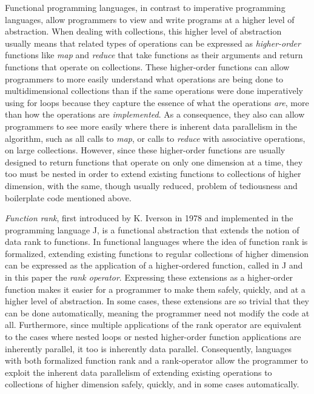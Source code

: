 Functional programming languages, in contrast to imperative programming languages, allow programmers to view and write programs at a higher level of abstraction.
When dealing with collections, 
this higher level of abstraction usually means that related types of operations can be expressed as \textit{higher-order} functions 
like \textit{map} and \textit{reduce} that take functions as their arguments and return functions that operate on collections.
These higher-order functions can allow programmers to more easily understand what operations are being done to multidimensional collections 
than if the same operations were done imperatively using for loops 
because they capture the essence of what the operations \textit{are}, more than how the operations are \textit{implemented}.
As a consequence, they also can allow programmers 
to see more easily where there is inherent data parallelism in the algorithm, 
such as all calls to \textit{map}, or calls to \textit{reduce} with associative operations, on large collections.
However, since these higher-order functions are usually designed to return functions that operate on only one dimension at a time, 
they too must be nested in order to extend existing functions to collections of higher dimension, 
with the same, though usually reduced, problem of tediousness and boilerplate code mentioned above.

\textit{Function rank}, first introduced by K. Iverson in 1978\cite{opandfunc} 
and implemented in the programming language J, 
is a functional abstraction that extends the notion of data rank to functions. 
In functional languages where the idea of function rank is formalized, 
extending existing functions to regular collections of higher dimension 
can be expressed as the application of a higher-ordered function, 
called in J and in this paper the \textit{rank operator}\cite{jvocab}. 
Expressing these extensions as a higher-order function 
makes it easier for a programmer to make them safely, quickly, and at a higher level of abstraction.
In some cases, these extensions are so trivial that they can be done automatically,\cite{jvocab} \cite{rankanduni} 
meaning the programmer need not modify the code at all. 
Furthermore, since multiple applications of the rank operator 
are equivalent to the cases where nested loops or nested higher-order function applications are inherently parallel, 
it too is inherently data parallel.
Consequently, languages with both formalized function rank and a rank-operator allow the programmer to 
exploit the inherent data parallelism of extending existing operations to collections of higher dimension 
safely, quickly, and in some cases automatically.

